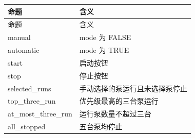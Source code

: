 \begin{longtable}{L{3.3cm}L{10.0cm}}

\toprule

命题 & 含义\\

\midrule

\endfirsthead

\toprule

命题 & 含义\\

\midrule

\endhead

{\ttfamily manual} & mode 为 FALSE\\

{\ttfamily automatic} & mode 为 TRUE\\

{\ttfamily start} & 启动按钮\\

{\ttfamily stop} & 停止按钮\\

{\ttfamily selected\_runs} & 手动选择的泵运行且未选择泵停止\\

{\ttfamily top\_three\_run} & 优先级最高的三台泵运行\\

{\ttfamily at\_most\_three\_run} & 运行泵数量不超过三台\\

{\ttfamily all\_stopped} & 五台泵均停止\\

\bottomrule

\end{longtable}

